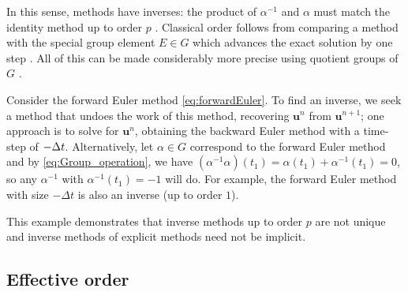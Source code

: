 In this sense, methods have inverses: the product of $\alpha^{-1}$ and
$\alpha$ must match the identity method up to order $p$
\cite{Butcher2008_book}.
Classical order follows from comparing a method with the special group
element $E \in G$ which advances the exact solution by one step
\cite{Butcher2008_book}.
All of this can be made considerably more precise using quotient
groups of $G$ \cite{Butcher2008_book}.


\begin{example}\label{ex:FE_inv_2}
  Consider the forward Euler method \eqref{eq:forwardEuler}.
  To find an inverse, we seek a method that undoes the work of this method,
  recovering $\bm{u}^{n}$ from $\bm{u}^{n+1}$;
  one approach is to solve for $\bm{u}^{n}$, obtaining the backward Euler method
  with a time-step of $-\Delta t$.
  Alternatively, let $\alpha \in G$ correspond to the forward Euler method and by
  \eqref{eq:Group_operation}, we have
  $(\alpha^{-1}\alpha)(t_1) = \alpha(t_1) + \alpha^{-1}(t_1) = 0$,
  so any $\alpha^{-1}$ with $\alpha^{-1}(t_1) = -1$ will do.
  For example, the forward Euler method with size $-\Delta t$ is also an
  inverse (up to order $1$).
\end{example}
This example demonstrates that inverse methods up to order $p$ are not
unique and inverse methods of explicit methods need not be implicit.


\subsection{Effective order}\label{sec:Effective_order}

